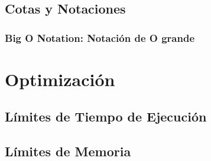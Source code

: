 \documentclass[12pt, fleqn]{report}                             %
\theoremstyle{break}                                            %
\begin{document}
        \section{Cotas y Notaciones}

            \subsection{Big O Notation: Notación de O grande}



    \clearpage
    \chapter{Optimización}

        \section{Límites de Tiempo de Ejecución}

        \section{Límites de Memoria}



    \clearpage
\end{document}
